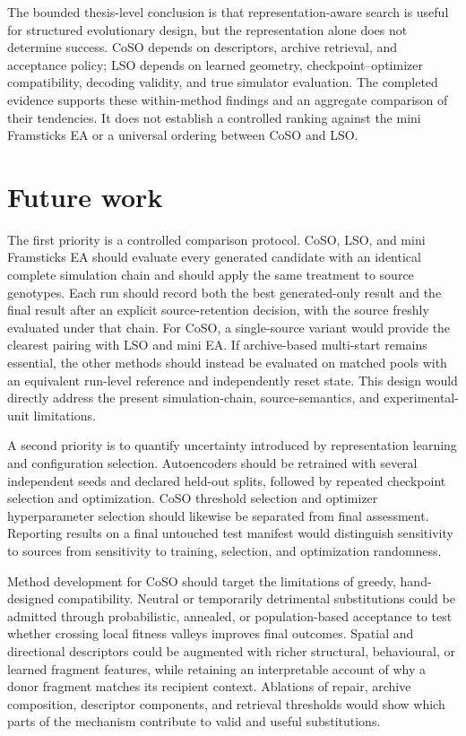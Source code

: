 The bounded thesis-level conclusion is that representation-aware search is useful for structured evolutionary design, but the representation alone does not determine success. CoSO depends on descriptors, archive retrieval, and acceptance policy; LSO depends on learned geometry, checkpoint--optimizer compatibility, decoding validity, and true simulator evaluation. The completed evidence supports these within-method findings and an aggregate comparison of their tendencies. It does not establish a controlled ranking against the mini Framsticks EA or a universal ordering between CoSO and LSO.

\section{Future work}

The first priority is a controlled comparison protocol. CoSO, LSO, and mini Framsticks EA should evaluate every generated candidate with an identical complete simulation chain and should apply the same treatment to source genotypes. Each run should record both the best generated-only result and the final result after an explicit source-retention decision, with the source freshly evaluated under that chain. For CoSO, a single-source variant would provide the clearest pairing with LSO and mini EA. If archive-based multi-start remains essential, the other methods should instead be evaluated on matched pools with an equivalent run-level reference and independently reset state. This design would directly address the present simulation-chain, source-semantics, and experimental-unit limitations.

A second priority is to quantify uncertainty introduced by representation learning and configuration selection. Autoencoders should be retrained with several independent seeds and declared held-out splits, followed by repeated checkpoint selection and optimization. CoSO threshold selection and optimizer hyperparameter selection should likewise be separated from final assessment. Reporting results on a final untouched test manifest would distinguish sensitivity to sources from sensitivity to training, selection, and optimization randomness.

Method development for CoSO should target the limitations of greedy, hand-designed compatibility. Neutral or temporarily detrimental substitutions could be admitted through probabilistic, annealed, or population-based acceptance to test whether crossing local fitness valleys improves final outcomes. Spatial and directional descriptors could be augmented with richer structural, behavioural, or learned fragment features, while retaining an interpretable account of why a donor fragment matches its recipient context. Ablations of repair, archive composition, descriptor components, and retrieval thresholds would show which parts of the mechanism contribute to valid and useful substitutions.

